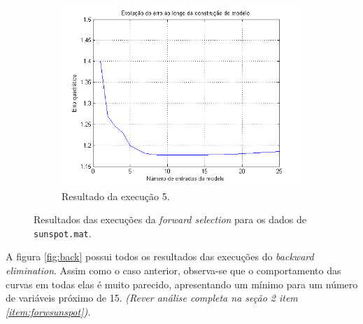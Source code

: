 \begin{figure}[H]
			\begin{subfigure}{.5\textwidth}
				  \centering
				  \includegraphics[width=1\linewidth]{image/forward5}
				  \caption{Resultado da execução 5.}
				  \label{forward5}
				\end{subfigure}	
			
			\caption{Resultados das execuções da \textit{forward selection} para os
			dados de \texttt{sunspot.mat}.}
			\label{fig:forw}
			\end{figure}
			
		\FloatBarrier


A figura \ref{fig:back} possui todos os resultados das
execuções do \textit{backward elimination}. Assim como o caso
anterior, observa-se que o comportamento das curvas em todas elas é muito
parecido, apresentando um mínimo para um número de variáveis próximo de 15.
\textit{(Rever análise completa na seção 2 item \ref{item:forwsunspot}).}
		
